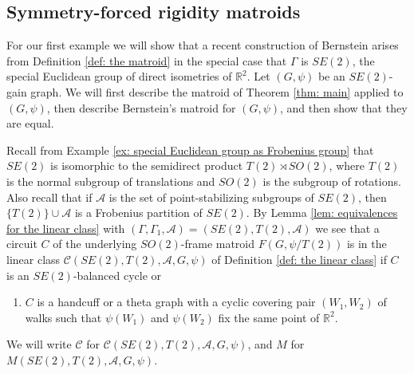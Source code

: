 \documentclass[12pt]{article}
\theoremstyle{definition}
\newcommand{\bR}{\mathbb R}
\newcommand{\cA}{\mathcal{A}}
\newcommand{\cC}{\mathcal{C}}
\begin{document}
\subsection{Symmetry-forced rigidity matroids} \label{sec: rigidity}


For our first example we will show that a recent construction of Bernstein \cite{Bernstein2022} arises from Definition \ref{def: the matroid} in the special case that $\Gamma$ is $SE(2)$, the special Euclidean group of direct isometries of $\bR^2$.
Let $(G, \psi)$ be an $SE(2)$-gain graph.
We will first describe the matroid of Theorem \ref{thm: main} applied to $(G, \psi)$, then describe Bernstein's matroid for $(G, \psi)$, and then show that they are equal.

Recall from Example \ref{ex: special Euclidean group as Frobenius group} that $SE(2)$ is isomorphic to the semidirect product $T(2) \rtimes SO(2)$, where $T(2)$ is the normal subgroup of translations and $SO(2)$ is the subgroup of rotations.
Also recall that if $\cA$ is the set of point-stabilizing subgroups of $SE(2)$, then $\{T(2)\} \cup \cA$ is a Frobenius partition of $SE(2)$.
By Lemma \ref{lem: equivalences for the linear class} with $(\Gamma, \Gamma_1, \cA) = (SE(2), T(2), \cA)$ we see that a circuit $C$ of the underlying $SO(2)$-frame matroid $F(G, \psi/T(2))$ is in the linear class $\cC(SE(2), T(2), \cA, G, \psi)$ of Definition \ref{def: the linear class} if $C$ is an $SE(2)$-balanced cycle or \begin{enumerate}

    \item[$(*)$] $C$ is a handcuff or a theta graph with a cyclic covering pair $(W_1, W_2)$ of walks such that $\psi(W_1)$ and $\psi(W_2)$ fix the same point of $\bR^2$.
\end{enumerate} 
We will write $\cC$ for $\cC(SE(2), T(2), \cA, G, \psi)$, and $M$ for $M(SE(2), T(2), \cA, G, \psi)$.
\end{document}
